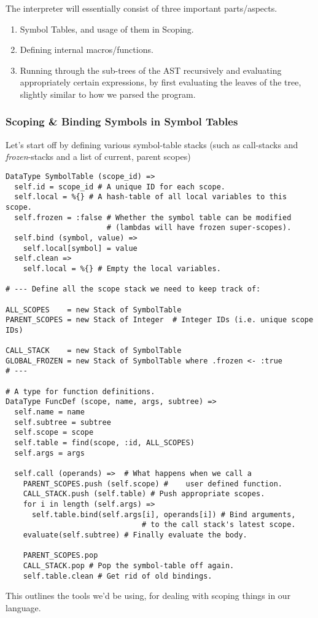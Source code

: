 \documentclass{article}
\begin{document}
    The interpreter will essentially consist of three important parts/aspects.
    \begin{enumerate}
      \item Symbol Tables, and usage of them in Scoping.
      \item Defining internal macros/functions.
      \item Running through the sub-trees of the AST recursively and evaluating
      appropriately certain expressions, by first evaluating the leaves of the
      tree, slightly similar to how we parsed the program.
    \end{enumerate}

    \clearpage

    \subsubsection{Scoping \& Binding Symbols in Symbol Tables}
    Let's start off by defining various symbol-table stacks (such as call-stacks
    and \emph{frozen}-stacks and a list of current, parent scopes)

\begin{verbatim}
DataType SymbolTable (scope_id) =>
  self.id = scope_id # A unique ID for each scope.
  self.local = %{} # A hash-table of all local variables to this scope.
  self.frozen = :false # Whether the symbol table can be modified
                       # (lambdas will have frozen super-scopes).
  self.bind (symbol, value) =>
    self.local[symbol] = value
  self.clean =>
    self.local = %{} # Empty the local variables.

# --- Define all the scope stack we need to keep track of:

ALL_SCOPES    = new Stack of SymbolTable
PARENT_SCOPES = new Stack of Integer  # Integer IDs (i.e. unique scope IDs)

CALL_STACK    = new Stack of SymbolTable
GLOBAL_FROZEN = new Stack of SymbolTable where .frozen <- :true
# ---

# A type for function definitions.
DataType FuncDef (scope, name, args, subtree) =>
  self.name = name
  self.subtree = subtree
  self.scope = scope
  self.table = find(scope, :id, ALL_SCOPES)
  self.args = args

  self.call (operands) =>  # What happens when we call a
    PARENT_SCOPES.push (self.scope) #    user defined function.
    CALL_STACK.push (self.table) # Push appropriate scopes.
    for i in length (self.args) =>
      self.table.bind(self.args[i], operands[i]) # Bind arguments,
                               # to the call stack's latest scope.
    evaluate(self.subtree) # Finally evaluate the body.

    PARENT_SCOPES.pop
    CALL_STACK.pop # Pop the symbol-table off again.
    self.table.clean # Get rid of old bindings.
\end{verbatim}
      This outlines the tools we'd be using, for dealing with scoping things in
      our language.
      \clearpage
\end{document}
